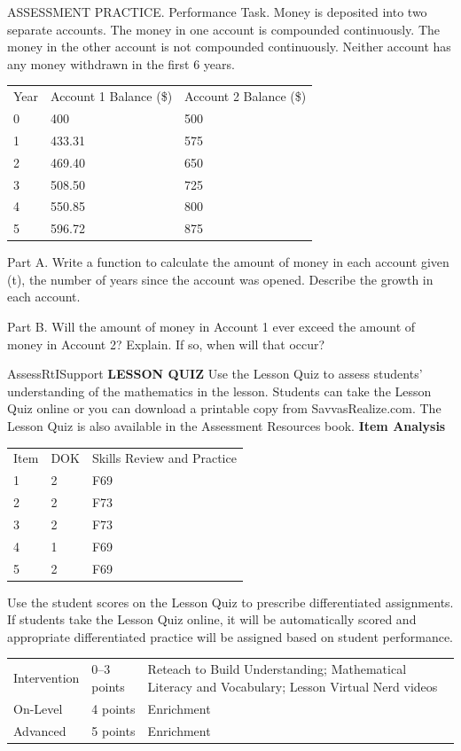 \documentclass{article}
\newenvironment{practice}[2]{}{}        %
\newenvironment{te-addendum}[2]{}{}     %
\newcommand{\answer}[1]{}               %
\newcommand{\uncertain}[2]{#1}          %
\newcommand{\te}[1]{}                   %
\begin{document}
\begin{practice}{58}{3}
ASSESSMENT PRACTICE. Performance Task. Money is deposited into two separate accounts. The money in one account is compounded continuously. The money in the other account is not compounded continuously. Neither account has any money withdrawn in the first 6 years.
\te{DOK \uncertain{3}{2}; item 58 is omitted from the printed Item Analysis and no DOK is printed beside the task.}
\begin{tabular}{lll}
Year & Account 1 Balance (\$) & Account 2 Balance (\$) \\
0 & 400 & 500 \\
1 & 433.31 & 575 \\
2 & 469.40 & 650 \\
3 & 508.50 & 725 \\
4 & 550.85 & 800 \\
5 & 596.72 & 875 \\
\end{tabular}
Part A. Write a function to calculate the amount of money in each account given (t), the number of years since the account was opened. Describe the growth in each account.
\answer{a. Account 1: (A=400e^{0.08t}); Account 2: (A=500+75t)}
Part B. Will the amount of money in Account 1 ever exceed the amount of money in Account 2? Explain. If so, when will that occur?
\answer{b. yes; Account 2 is increasing at a constant rate while Account 1 is increasing at an increasing rate, so after a certain point the amount of money in Account 1 will exceed the amount of money in Account 2; in about 20 years.}
\end{practice}
\begin{te-addendum}{Assess}{RtISupport}
\textbf{LESSON QUIZ}
Use the Lesson Quiz to assess students' understanding of the mathematics in the lesson.
Students can take the Lesson Quiz online or you can download a printable copy from SavvasRealize.com. The Lesson Quiz is also available in the Assessment Resources book.
\textbf{Item Analysis}
\begin{tabular}{lll}
Item & DOK & Skills Review and Practice \\
1 & 2 & F69 \\
2 & 2 & F73 \\
3 & 2 & F73 \\
4 & 1 & F69 \\
5 & 2 & F69 \\
\end{tabular}
Use the student scores on the Lesson Quiz to prescribe differentiated assignments.
If students take the Lesson Quiz online, it will be automatically scored and appropriate differentiated practice will be assigned based on student performance.
\begin{tabular}{lll}
Intervention & 0--3 points & Reteach to Build Understanding; Mathematical Literacy and Vocabulary; Lesson Virtual Nerd videos \\
On-Level & 4 points & Enrichment \\
Advanced & 5 points & Enrichment \\
\end{tabular}
\end{te-addendum}
\end{document}
